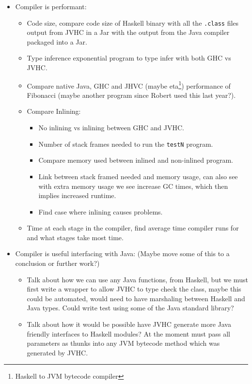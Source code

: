\documentclass[a4paper]{article}
\begin{document}
\begin{itemize}
  \item Compiler is performant:
    \begin{itemize}
      \item Code size, compare code size of Haskell binary with
        all the \texttt{.class} files output from JVHC in a Jar with the output
        from the Java compiler packaged into a Jar.
      \item Type inference exponential program to type infer with both
        GHC vs JVHC.
      \item Compare native Java, GHC and JHVC (maybe 
        eta\footnote{Haskell to JVM bytecode compiler}) performance of 
        Fibonacci (maybe another program since Robert used this last year?).
      \item Compare Inlining:
        \begin{itemize}
          \item No inlining vs inlining between GHC and JVHC.
          \item Number of stack frames needed to run the \texttt{testN} 
            program.
          \item Compare memory used between inlined and non-inlined program.
          \item Link between stack framed needed and memory usage, can
            also see with extra memory usage we see increase
            GC times, which then implies increased runtime.
          \item Find case where inlining causes problems.
        \end{itemize}
      \item Time at each stage in the compiler, find average time 
        compiler runs for and what stages take most time.
    \end{itemize}

  \item Compiler is useful interfacing with Java: (Maybe move some of this 
    to a conclusion or further work?)
    \begin{itemize}   
      \item Talk about how we can use any Java functions, from Haskell, but 
    we must first write a wrapper to allow JVHC to type check the class, 
    maybe this could be automated, would need to have marshaling between
    Haskell and Java types. Could write test using some of the Java
    standard library?
      \item Talk about how it would be possible have JVHC generate 
        more Java friendly interfaces to Haskell modules? At the 
        moment must pass all parameters as thunks into any
        JVM bytecode method which was generated by JVHC.
\end{itemize}


\end{itemize}
\end{document}
